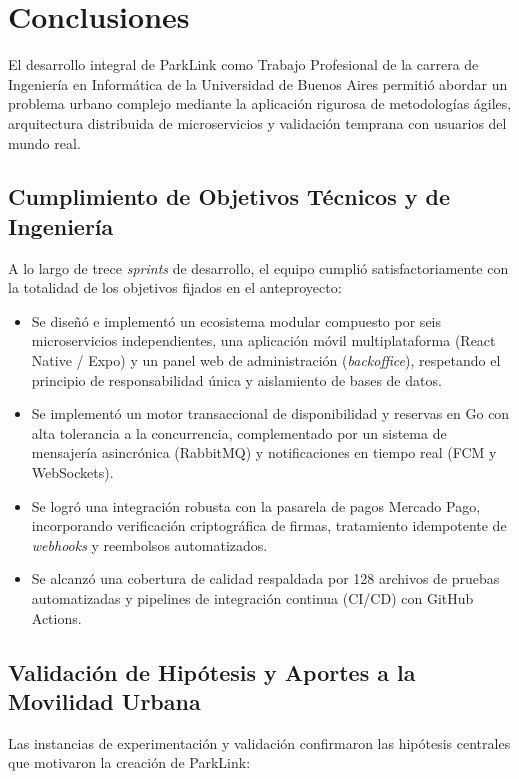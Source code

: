 \section{Conclusiones}\label{sec:conclusiones}

El desarrollo integral de ParkLink como Trabajo Profesional de la carrera de Ingeniería en Informática de la Universidad de Buenos Aires permitió abordar un problema urbano complejo mediante la aplicación rigurosa de metodologías ágiles, arquitectura distribuida de microservicios y validación temprana con usuarios del mundo real.

\subsection{Cumplimiento de Objetivos Técnicos y de Ingeniería}

A lo largo de trece \textit{sprints} de desarrollo, el equipo cumplió satisfactoriamente con la totalidad de los objetivos fijados en el anteproyecto:

\begin{itemize}
    \item Se diseñó e implementó un ecosistema modular compuesto por seis microservicios independientes, una aplicación móvil multiplataforma (React Native / Expo) y un panel web de administración (\textit{backoffice}), respetando el principio de responsabilidad única y aislamiento de bases de datos.
    \item Se implementó un motor transaccional de disponibilidad y reservas en Go con alta tolerancia a la concurrencia, complementado por un sistema de mensajería asincrónica (RabbitMQ) y notificaciones en tiempo real (FCM y WebSockets).
    \item Se logró una integración robusta con la pasarela de pagos Mercado Pago, incorporando verificación criptográfica de firmas, tratamiento idempotente de \textit{webhooks} y reembolsos automatizados.
    \item Se alcanzó una cobertura de calidad respaldada por 128 archivos de pruebas automatizadas y pipelines de integración continua (CI/CD) con GitHub Actions.
\end{itemize}

\subsection{Validación de Hipótesis y Aportes a la Movilidad Urbana}

Las instancias de experimentación y validación confirmaron las hipótesis centrales que motivaron la creación de ParkLink:

